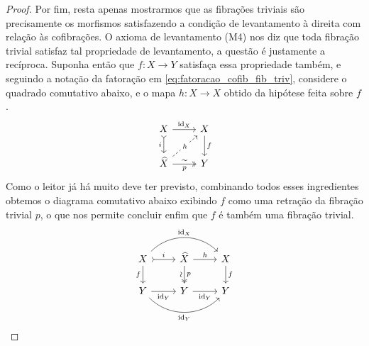 \begin{proof}
  Por fim, resta apenas mostrarmos que as fibrações triviais são precisamente os morfismos satisfazendo a condição de levantamento à direita com relação às cofibrações.
  O axioma de levantamento (M4) nos diz que toda fibração trivial satisfaz tal propriedade de levantamento, a questão é justamente a recíproca.
  Suponha então que $f: X \to Y$ satisfaça essa propriedade também, e seguindo a notação da fatoração em \eqref{eq:fatoracao_cofib_fib_triv}, considere o quadrado comutativo abaixo, e o mapa $h: \widehat{X} \to X$ obtido da hipótese feita sobre $f$.
  \begin{displaymath}
    \begin{tikzcd}
      X
      \arrow[r, "\id_{X}"]
      \arrow[d, tail, "i" swap]
      & X
      \arrow[d, "f"]
      \\ \widehat{X}
      \arrow[r, two heads, "p" {swap}, "\sim"]
      \arrow[ru, dashed, "h" description]
      & Y
    \end{tikzcd}
  \end{displaymath}
  Como o leitor já há muito deve ter previsto, combinando todos esses ingredientes obtemos o diagrama comutativo abaixo exibindo $f$ como uma retração da fibração trivial $p$, o que nos permite concluir enfim que $f$ é também uma fibração trivial.
  \begin{displaymath}
    \begin{tikzcd}
      X
      \arrow[r, tail, "i"]
      \arrow[d, "f" swap]
      \arrow[rr, bend left=45, "\id_{X}"]
      & \widehat{X}
      \arrow[r, "h"]
      \arrow[d, two heads, "p", "\sim" {swap,sloped}]
      & X
      \arrow[d, "f"]
      \\ Y
      \arrow[r, "\id_{Y}" swap]
      \arrow[rr, bend right=45, "\id_{Y}" swap]
      & Y
      \arrow[r, "\id_{Y}" swap]
      & Y
    \end{tikzcd} \qedhere
  \end{displaymath}
\end{proof}

